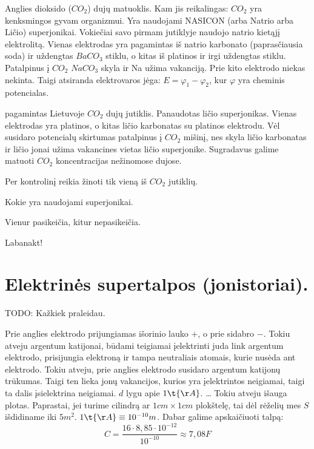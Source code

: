 Anglies dioksido ($CO_{2}$) dujų matuoklis. Kam jis reikalingas:
$CO_{2}$ yra kenksmingos gyvam organizmui. Yra naudojami
NASICON (arba Natrio arba Ličio) superjonikai. Vokiečiai savo
pirmam jutiklyje naudojo natrio kietąjį elektrolitą. Vienas elektrodas
yra pagamintas iš natrio karbonato (paprasčiausia soda) ir uždengtas
$BaCO_{3}$ stiklu, o kitas iš platinos ir irgi uždengtas stiklu.
Patalpinus į $CO_{2}$ $NaCO_{3}$ skyla ir Na užima vakanciją.
Prie kito elektrodo niekas nekinta. Taigi atsiranda elektrovaros
jėga: $E = \varphi_{1} - \varphi_{2}$, kur $\varphi$ yra cheminis
potencialas.

 pagamintas Lietuvoje $CO_{2}$ dujų jutiklis. Panaudotas
ličio superjonikas. Vienas elektrodas yra platinos, o kitas ličio
karbonatas su platinos elektrodu. Vėl susidaro potencialų skirtumas
patalpinus į $CO_{2}$ mišinį, nes skyla ličio karbonatas ir ličio
jonai užima vakancines vietas ličio superjonike. Sugradavus
galime matuoti $CO_{2}$ koncentracijas nežinomose dujose.

\begin{note}
  Per kontrolinį reikia žinoti tik vieną iš $CO_{2}$ jutiklių.
\end{note}

\begin{remember}
  \item Kokie yra naudojami superjonikai.
  \item Vienur pasikeičia, kitur nepasikeičia.
  \item Labanakt!
\end{remember}

\section{Elektrinės supertalpos (jonistoriai).}

TODO: Kažkiek praleidau.

Prie anglies elektrodo prijungiamas išorinio lauko $+$, o prie sidabro
$-$. Tokiu atveju argentum katijonai, būdami teigiamai įelektrinti
juda link argentum elektrodo, prisijungia elektroną ir tampa
neutraliais atomais, kurie nusėda ant elektrodo. Tokiu atveju, prie
anglies elektrodo susidaro argentum katijonų trūkumas. Taigi ten
lieka jonų vakancijos, kurios yra įelektrintos neigiamai, taigi
ta dalis įsielektrina neigiamai. $d$ lygu apie $1 \t{Å}$. … Tokiu atveju
išauga plotas. Paprastai, jei turime cilindrą ar $1 cm \times 1 cm$
plokštelę, tai dėl rėželių mes $S$ išdidiname iki $5m^{2}$.
$1\t{Å} \equiv 10^{-10} m$. Dabar galime apskaičiuoti talpą:
\begin{equation*}
  C = \frac{16 \cdot 8,85 \cdot 10^{-12}}{10^{-10}}
  \approx 7,08 F
\end{equation*}

